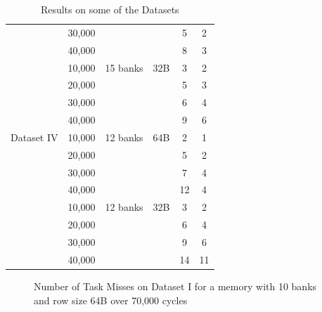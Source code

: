 \begin{table}
\begin{tabular}{|c|c|c|c|c|c|}
             & 30,000 &          &     & 5 & 2 \\
             & 40,000 &          &     & 8 & 3 \\ \hline
             &10,000 & 15 banks & 32B & 3 & 2 \\  
             & 20,000&          &     & 5 & 3 \\
             & 30,000&          &     & 6 & 4 \\
             & 40,000&          &     & 9 & 6 \\ \hline
 Dataset IV  & 10,000& 12 banks & 64B & 2 & 1 \\
             & 20,000 &         &     & 5 & 2 \\
             & 30,000 &         &     & 7 & 4 \\
             & 40,000 &         &     & 12 & 4 \\ \hline
             &10,000 & 12 banks & 32B & 3 & 2 \\
             & 20,000 &         &     & 6 & 4 \\
             & 30,000 &         &     & 9 & 6 \\
             & 40,000 &         &     & 14 & 11\\ \hline  
 \end{tabular}
\caption{Results on some of the Datasets}
\label{tab13}
\end{table}


\begin{figure}
\centering
{}
\caption{Number of Task Misses on Dataset I for a memory with 10 banks and row size 64B over 70,000 cycles}
\end{figure}



